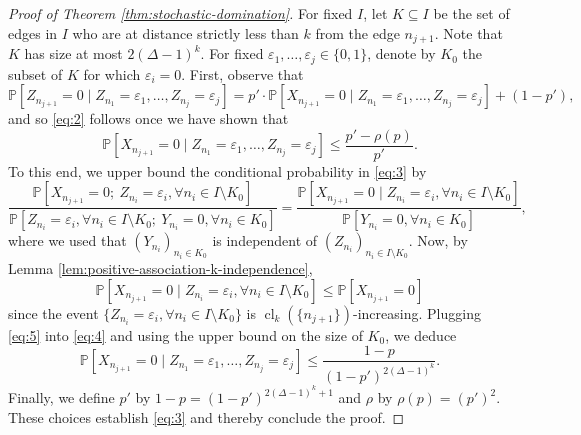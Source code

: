 \documentclass[11pt]{article}
\DeclareMathOperator{\cl}{cl}
\theoremstyle{remark}
\begin{document}
\begin{proof}[Proof of Theorem \ref{thm:stochastic-domination}]
	For fixed $I$,  let $K\subseteq I$ be the set of edges in $I$ who are at distance strictly less than $k$ from the edge $n_{j+1}$. Note that $K$ has size at most $2(\Delta-1)^k$. For fixed $\varepsilon_1,\ldots,\varepsilon_j \in \{0,1\}$, denote by $K_0$ the subset of $K$ for which $\varepsilon_i = 0$. First, observe that 
	\begin{equation}
		\mathbb P[Z_{n_{j+1}} = 0 \mid Z_{n_1} = \varepsilon_1,\ldots,Z_{n_j}=\varepsilon_j] = p' \cdot \mathbb P[X_{n_{j+1}} = 0 \mid Z_{n_1} = \varepsilon_1,\ldots,Z_{n_j}=\varepsilon_j] + (1 - p'),
	\end{equation}
	and so \eqref{eq:2} follows once we have shown that 
	\begin{equation}\label{eq:3}
		\mathbb P[X_{n_{j+1}} = 0 \mid Z_{n_1} = \varepsilon_1,\ldots,Z_{n_j}=\varepsilon_j] \le \frac{p' - \rho(p)}{p'}.
	\end{equation}
	To this end, we upper bound the conditional probability in \eqref{eq:3} by 
	\begin{equation}\label{eq:4}
		\frac{\mathbb P[X_{n_{j+1}} = 0;\ Z_{n_i} = \varepsilon_i, \forall n_i \in I \setminus K_0]}{\mathbb P[Z_{n_i} = \varepsilon_i, \forall n_i \in I \setminus K_0;\ Y_{n_i} = 0, \forall n_i \in K_0]} = \frac{\mathbb P[X_{n_{j+1}} = 0 \mid Z_{n_i} = \varepsilon_i, \forall n_i \in I \setminus K_0]}{\mathbb P[Y_{n_i} = 0, \forall n_i \in K_0]},
	\end{equation}
	where we used that $(Y_{n_i})_{n_i\in K_0}$ is independent of $(Z_{n_i})_{n_i \in I \setminus K_0}$. Now, by Lemma \ref{lem:positive-association-k-independence}, 
	\begin{equation}\label{eq:5}
		\mathbb P[X_{n_{j+1}} = 0 \mid Z_{n_i} = \varepsilon_i, \forall n_i \in I \setminus K_0] \le \mathbb P[X_{n_{j+1}} = 0]
	\end{equation}
	since the event $\{Z_{n_i} = \varepsilon_i, \forall n_i \in I \setminus K_0\}$ is $\cl_k(\{n_{j+1}\})$-increasing. Plugging \eqref{eq:5} into \eqref{eq:4} and using the upper bound on the size of $K_0$, we deduce 
	\begin{equation}\label{eq:6}
		\mathbb P[X_{n_{j+1}} = 0 \mid Z_{n_1} = \varepsilon_1,\ldots,Z_{n_j}=\varepsilon_j] \le \frac{1-p}{(1-p')^{2(\Delta-1)^k}}.
	\end{equation}
	Finally, we define $p'$ by $1-p = (1-p')^{2(\Delta-1)^k +1}$ and $\rho$ by $\rho(p) = (p')^2$. These choices establish \eqref{eq:3} and thereby conclude the proof.
\end{proof}
\end{document}

